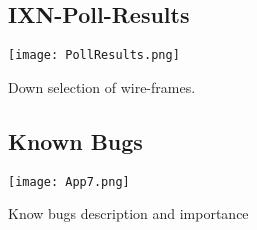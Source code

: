 \documentclass[fontsize=11pt]{extarticle}
\numberwithin{figure}{section} %
\begin{document}
 \begin{landscape}
\subsection{IXN-Poll-Results}
\begin{table}[H]
      \centering
      \texttt{[image: PollResults.png]}
      \caption{Down selection of wire-frames.}
 \end{table}
 \end{landscape}

 \newpage

\begin{landscape}
\subsection{Known Bugs}
 \begin{table}[H]
      \centering
      \texttt{[image: App7.png]}
      \caption{Know bugs description and importance}
 \end{table}
\end{landscape}
\end{document}
